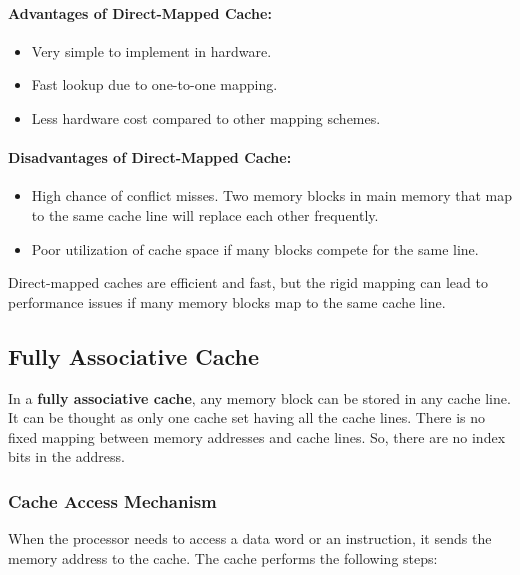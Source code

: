 \documentclass[12pt]{book}
\begin{document}
\paragraph{Advantages of Direct-Mapped Cache:}
\begin{itemize}
    \item Very simple to implement in hardware.
    \item Fast lookup due to one-to-one mapping.
    \item Less hardware cost compared to other mapping schemes.
\end{itemize}

\paragraph{Disadvantages of Direct-Mapped Cache:}
\begin{itemize}
    \item High chance of conflict misses. Two memory blocks in main memory that map to the same cache line will replace each other frequently.
    \item Poor utilization of cache space if many blocks compete for the same line.
\end{itemize}

Direct-mapped caches are efficient and fast, but the rigid mapping can lead to performance issues if many memory blocks map to the same cache line.

\subsection{Fully Associative Cache}
\label{sec:fully-associative-cache}

In a \textbf{fully associative cache}, any memory block can be stored in any cache line. It can be thought as only one cache set having all the cache lines. There is no fixed mapping between memory addresses and cache lines. So, there are no index bits in the address.

\subsubsection*{Cache Access Mechanism}
When the processor needs to access a data word or an instruction, it sends the memory address to the cache. The cache performs the following steps:
\end{document}
